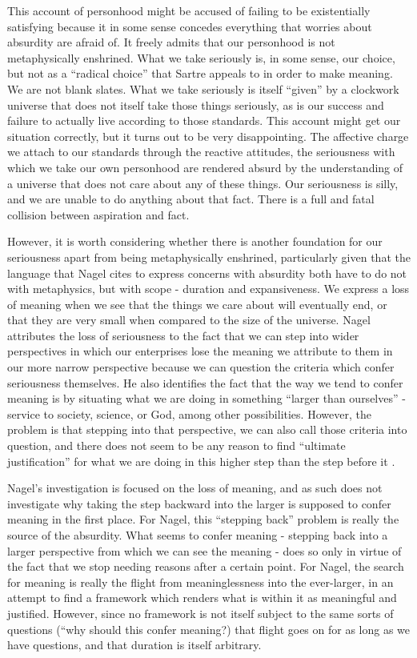 \documentclass[phd,12pt,oneside,paper=letterpaper]{ubcthesis}
\begin{document}
This account of personhood might be accused of failing to be existentially satisfying because it in some sense concedes everything that worries about absurdity are afraid of. It freely admits that our personhood is not metaphysically enshrined. What we take seriously is, in some sense, our choice, but not as a ``radical choice'' that Sartre appeals to in order to make meaning. We are not blank slates. What we take seriously is itself ``given'' by a clockwork universe that does not itself take those things seriously, as is our success and failure to actually live according to those standards. This account might get our situation correctly, but it turns out to be very disappointing. The affective charge we attach to our standards through the reactive attitudes, the seriousness with which we take our own personhood are rendered absurd by the understanding of a universe that does not care about any of these things. Our seriousness is silly, and we are unable to do anything about that fact. There is a full and fatal collision between aspiration and fact. 

However, it is worth considering whether there is another foundation for our seriousness apart from being metaphysically enshrined, particularly given that the language that Nagel cites to express concerns with absurdity both have to do not with metaphysics, but with scope - duration and expansiveness. We express a loss of meaning when we see that the things we care about will eventually end, or that they are very small when compared to the size of the universe. Nagel attributes the loss of seriousness to the fact that we can step into wider perspectives in which our enterprises lose the meaning we attribute to them in our more narrow perspective because we can question the criteria which confer seriousness themselves. He also identifies the fact that the way we tend to confer meaning is by situating what we are doing in something ``larger than ourselves'' - service to society, science, or God, among other possibilities. However, the problem is that stepping into that perspective, we can also call those criteria into question, and there does not seem to be any reason to find ``ultimate justification'' for what we are doing in this higher step than the step before it \citep[p.23]{nagel1979}.

Nagel's investigation is focused on the loss of meaning, and as such does not investigate why taking the step backward into the larger is supposed to confer meaning in the first place. For Nagel, this ``stepping back'' problem is really the source of the absurdity. What seems to confer meaning - stepping back into a larger perspective from which we can see the meaning - does so only in virtue of the fact that we stop needing reasons after a certain point. For Nagel, the search for meaning is really the flight from meaninglessness into the ever-larger, in an attempt to find a framework which renders what is within it as meaningful and justified. However, since no framework is not itself subject to the same sorts of questions (``why should this confer meaning?) that flight goes on for as long as we have questions, and that duration is itself arbitrary.
\end{document}
